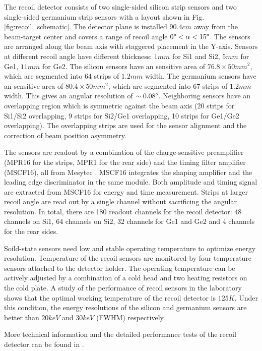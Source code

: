 \documentclass[number,5p]{elsarticle}
\begin{document}
The recoil detector consists of two single-sided silicon strip sensors and two
single-sided germanium strip sensors with a layout shown in Fig. \ref{fig:recoil_schematic}.
The detector plane is installed $90.4 cm$ away from the beam-target center
and covers a range of recoil angle $0\degree < \alpha < 15\degree$.
The sensors are arranged along the beam axis with staggered placement in the Y-axis.
Sensors at different recoil angle have different thickness: $1 mm$ for Si1 and Si2, $5 mm$ for Ge1, $11 mm$ for Ge2.
The silicon sensors have an sensitive area of \(76.8 \times 50 mm^2\), which are
segmented into 64 strips of $1.2 mm$ width.
The germanium sensors have an sensitive area of \(80.4 \times 50 mm^2\), which are segmented into 67 strips of $1.2 mm$ width.
This gives an angular resolution of $\sim0.08\degree$.
Neighboring sensors have an overlapping region which is symmetric against
the beam axis (20 strips for Si1/Si2 overlapping, 9 strips for Si2/Ge1 overlapping, 10 strips for Ge1/Ge2 overlapping).
The overlapping strips are used for the sensor alignment and the correction of beam position asymmetry.

The sensors are readout by a combination of the charge-sensitive preamplifier (MPR16 for the strips, MPR1 for the rear side) 
and the timing filter amplifier (MSCF16), all from Mesytec \cite{mesytec}. 
MSCF16 integrates the shaping amplifier and the leading edge discriminator in the same module.
Both amplitude and timing signal are extracted from MSCF16 for energy and time measurement.
Strips at larger recoil angle are read out by a single channel without sacrificing the angular resolution.
In total, there are 180 readout channels for the recoil detector: 
48 channels on Si1, 64 channels on Si2, 32 channels for Ge1 and Ge2 and 4
channels for the rear sides. 

Soild-state sensors need low and stable operating temperature to optimize energy
resolution.
Temperature of the recoil sensors are monitored by four temperature sensors
attached to the detector holder.
The operating temperature can be actively adjusted by a combination of a cold head and two heating resistors on the cold plate.
A study of the performance of recoil sensors in the laboratory shows that the
optimal working temperature of the recoil detector is $125 K$.
Under this condition, the energy resolutions of the silicon and germanium
sensors are better than $20 keV$ and $30 keV$ (FWHM) respectively.

More technical information and the detailed performance tests of the recoil detector can be found in \cite{recoil_article}.
\end{document}
